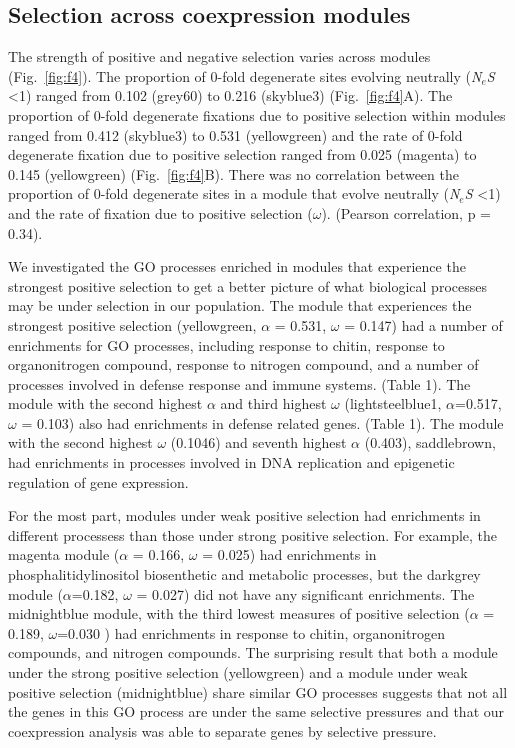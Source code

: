 \subsection{Selection across coexpression modules}
The strength of positive and negative selection varies across modules (Fig.~\ref{fig:f4}). The proportion of 0-fold degenerate sites evolving neutrally (\textit{N$_{e}$S} \textless 1) ranged from 0.102 (grey60) to 0.216 (skyblue3) (Fig.~\ref{fig:f4}A). The proportion of 0-fold degenerate fixations due to positive selection within modules ranged from  0.412 (skyblue3) to 0.531 (yellowgreen) and the rate of 0-fold degenerate fixation due to positive selection ranged from 0.025 (magenta) to 0.145 (yellowgreen) (Fig.~\ref{fig:f4}B). There was no correlation between the proportion of 0-fold degenerate sites in a module that evolve neutrally (\textit{N$_{e}$S} \textless 1) and the rate of fixation due to positive selection ($\omega$). (Pearson correlation, p = 0.34). 

We investigated the GO processes enriched in modules that experience the strongest positive selection to get a better picture of what biological processes may be under selection in our population. The module that experiences the strongest positive selection (yellowgreen, $\alpha$ = 0.531, $\omega$ = 0.147) had a number of enrichments for GO processes, including response to chitin, response to organonitrogen compound, response to nitrogen compound, and a number of processes involved in defense response and immune systems. (Table 1). The module with the second highest $\alpha$ and third highest $\omega$ (lightsteelblue1, $\alpha$=0.517, $\omega$ = 0.103) also had enrichments in defense related genes. (Table 1).  The module with the second highest $\omega$ (0.1046) and seventh highest $\alpha$ (0.403), saddlebrown, had enrichments in processes involved in DNA replication and epigenetic regulation of gene expression.

For the most part, modules under weak positive selection had enrichments in different processess than those under strong positive selection. For example, the magenta module ($\alpha$ = 0.166, $\omega$ = 0.025) had enrichments in phosphalitidylinositol biosenthetic and metabolic processes, but the darkgrey module ($\alpha$=0.182, $\omega$ = 0.027) did not have any significant enrichments. The midnightblue module, with the third lowest measures of positive selection ($\alpha$ = 0.189, $\omega$=0.030 ) had enrichments in response to chitin, organonitrogen compounds, and nitrogen compounds. The surprising result that both a module under the strong positive selection (yellowgreen) and a module under weak positive selection (midnightblue) share similar GO processes suggests that not all the genes in this GO process are under the same selective pressures and that our coexpression analysis was able to separate genes by selective pressure.



